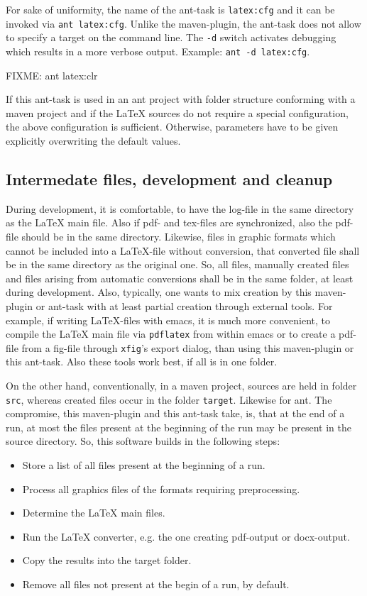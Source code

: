 \documentclass[12pt]{article}
\begin{document}
For sake of uniformity, 
the name of the ant-task is {\tt latex:cfg} 
and it can be invoked via {\tt ant latex:cfg}. 
Unlike the maven-plugin, the ant-task 
does not allow to specify a target on the command line. 
The {\tt -d} switch activates debugging 
which results in a more verbose output. 
Example: {\tt ant -d latex:cfg}. 

FIXME: ant latex:clr 

If this ant-task is used in an ant project 
with folder structure conforming with a maven project 
and if the \LaTeX{} sources do not require a special configuration, 
the above configuration is sufficient. 
Otherwise, parameters have to be given explicitly 
overwriting the default values. 

\subsection{Intermedate files, development and cleanup}\label{subsec:devel}

During development, it is comfortable, 
to have the log-file in the same directory as the \LaTeX{} main file. 
Also if pdf- and tex-files are synchronized, 
also the pdf-file should be in the same directory. 
Likewise, files in graphic formats 
which cannot be included into a \LaTeX-file without conversion, 
that converted file shall be in the same directory as the original one. 
So, all files, manually created files 
and files arising from automatic conversions 
shall be in the same folder, at least during development. 
Also, typically, one wants to mix creation by this maven-plugin or ant-task 
with at least partial creation through external tools. 
For example, if writing \LaTeX-files with emacs, 
it is much more convenient, to compile the \LaTeX{} main file 
via {\tt pdflatex} from within emacs 
or to create a pdf-file from a \gls{fig}-file 
through {\tt xfig}'s export dialog, 
than using this maven-plugin or this ant-task. 
Also these tools work best, if all is in one folder. 

On the other hand, 
conventionally, in a maven project, 
sources are held in folder {\tt src}, 
whereas created files occur in the folder {\tt target}. 
Likewise for ant. 
The compromise, this maven-plugin and this ant-task take, 
is, that at the end of a run, 
at most the files present at the beginning of the run 
may be present in the source directory. 
So, this software builds in the following steps: 
%
\begin{itemize}
\item
Store a list of all files present at the beginning of a run.
\item
Process all graphics files of the formats requiring preprocessing.
\item
Determine the \LaTeX{} main files.
\item
Run the \LaTeX{} converter, e.g. the one creating pdf-output or docx-output.
\item
Copy the results into the target folder.
\item
Remove all files not present at the begin of a run, by default. 
\end{itemize}
\end{document}
